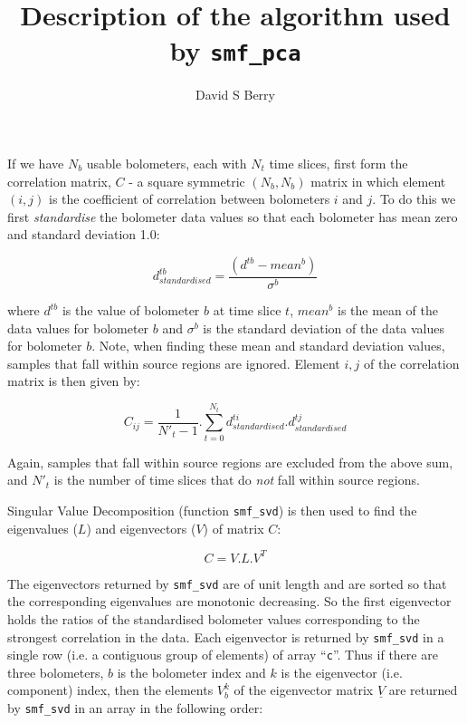 \documentclass{article}
\renewcommand{\vec}[1]{\underline{#1}}
\begin{document}
\title{Description of the algorithm used by \texttt{smf\_pca}}
\author{David S Berry}
\maketitle

If we have $N_b$ usable bolometers, each with $N_t$ time slices, first form
the correlation matrix, $C$ - a square symmetric $(N_b,N_b)$ matrix in which element
$(i,j)$ is the coefficient of correlation between bolometers $i$ and $j$.
To do this we first \emph{standardise} the bolometer data values so that each
bolometer has mean zero and standard deviation 1.0:

\begin{equation*}
d_{standardised}^{tb} = \frac{( d^{tb} - mean^b )}{\sigma^b}
\end{equation*}

where $d^{tb}$ is the value of bolometer $b$ at time slice $t$, $mean^b$ is
the mean of the data values for bolometer $b$ and $\sigma^b$ is the
standard deviation of the data values for bolometer $b$. Note, when
finding these mean and standard deviation values, samples that fall
within source regions are ignored. Element $i,j$ of the correlation matrix
is then given by:

\begin{equation*}
C_{ij} = \frac{1}{N'_t-1}.\sum_{t=0}^{N_t} d_{standardised}^{ti}.d_{standardised}^{tj}
\end{equation*}

Again, samples that fall within source regions are excluded from the
above sum, and $N'_t$ is the number of time slices that do \emph{not}
fall within source regions.


Singular Value Decomposition (function \texttt{smf\_svd}) is then used to find the
eigenvalues ($L$) and eigenvectors ($V$) of matrix $C$:

\begin{equation*}
C = V.L.V^T
\end{equation*}

The eigenvectors returned by \texttt{smf\_svd} are of unit length and are
sorted so that the corresponding eigenvalues are monotonic decreasing. So
the first eigenvector holds the ratios of the standardised bolometer values
corresponding to the strongest correlation in the data. Each eigenvector
is returned by \texttt{smf\_svd} in a single row (i.e. a contiguous group
of elements) of array ``\texttt{c}''. Thus if there are three bolometers,
$b$ is the bolometer index and $k$ is the eigenvector (i.e. component)
index, then the elements $V_b^k$ of the eigenvector matrix $\vec{V}$ are
returned by \texttt{smf\_svd} in an array in the following order:
\end{document}

